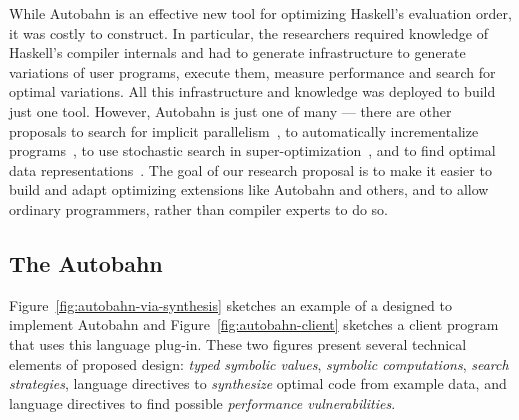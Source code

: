 While Autobahn is an effective new tool for optimizing Haskell's evaluation
order, it was costly to construct.  In particular, the researchers
required knowledge of Haskell's compiler internals and had to generate
infrastructure to generate variations of user programs, execute them,
measure performance and search for optimal variations.  All this
infrastructure and knowledge was deployed to build just one tool.  
However, Autobahn is just one of many --- there are other proposals to
search for implicit parallelism~\cite{implicit-parallel}, to
automatically incrementalize 
programs~\cite{type-directed-incrementalization}, to use stochastic search
in super-optimization~\cite{stochastic-superopt}, and to find optimal data 
representations~\cite{data-rep-synth,conc-data-rep-synth}.  The goal of our research proposal
is to make it easier to build and adapt optimizing extensions like
Autobahn and others, and to allow ordinary programmers, rather than 
compiler experts to do so.  

\subsection{The Autobahn \rasp}
\label{sec:autobahn}

Figure~\ref{fig:autobahn-via-synthesis} sketches an example of a 
\rasp{} designed to implement Autobahn and Figure~\ref{fig:autobahn-client} sketches a client program that uses this language plug-in.  These two 
figures present
several technical elements of proposed design:  \emph{typed symbolic values}, 
\emph{symbolic computations}, \emph{search strategies}, language directives to
\emph{synthesize} optimal code from example data, and language directives to
find possible \emph{performance vulnerabilities}. 


